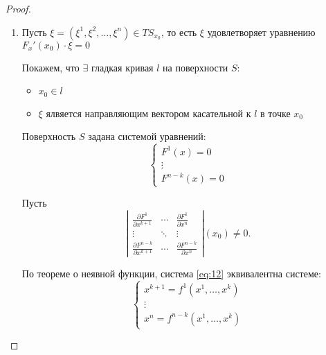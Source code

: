 \begin{proof}
\begin{enumerate}
        \item Пусть $\xi = (\xi^1,\xi^2,\ldots,\xi^n) \in TS_{x_0}$, то есть $\xi$ удовлетворяет уравнению $F_x'(x_0)\cdot \xi = 0$

              Покажем, что $\exists$ гладкая кривая $l$ на поверхности $S$:
              \begin{itemize}
                  \item $x_0 \in l$
                  \item $\xi$ ялвяется направляющим вектором касательной к $l$ в точке $x_0$
              \end{itemize}

              Поверхность $S$ задана системой уравнений:
              \begin{equation}\label{eq:12}
                  \left\{\begin{array}{l}
                      F^1(x) = 0 \\
                      \vdots     \\
                      F^{n-k}(x) = 0
                  \end{array}\right.
              \end{equation}

              Пусть
              \begin{equation*}
                  \left|\begin{matrix}
                      \frac{\partial F^1}{\partial x^{k+1}}     & \cdots & \frac{\partial F^1}{\partial x^n}     \\
                      \vdots                                & \ddots & \vdots                            \\
                      \frac{\partial F^{n-k}}{\partial x^{k+1}} & \cdots & \frac{\partial F^{n-k}}{\partial x^n}
                  \end{matrix}\right| (x_0) \ne 0.
              \end{equation*}

              По теореме о неявной функции, система \ref{eq:12} эквивалентна системе:
              \begin{equation}\label{eq:13}
                  \left\{\begin{array}{l}
                      x^{k+1} = f^1(x^1,\ldots,x^k) \\
                      \vdots                        \\
                      x^n = f^{n-k}(x^1,\ldots,x^k)
                  \end{array}\right.
              \end{equation}


\end{enumerate}
\end{proof}
